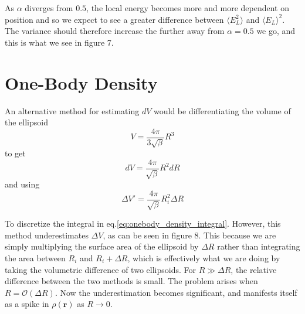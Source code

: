 \documentclass[
    a4paper, aps, twocolumn, floatfix, superscriptaddress,
    nofootinbib]{revtex4-1}
\begin{document}
\begin{appendices}
As $\alpha$ diverges from $0.5$, the local energy becomes more and more dependent on position and so we expect to see a greater difference between $\langle E_L^2 \rangle$ and $\langle E_L \rangle^2$. The variance should therefore increase the further away from $\alpha = 0.5$ we go, and this is what we see in figure 7. 

\section{One-Body Density}
An alternative method for estimating $dV$ would be differentiating the volume of the ellipsoid
\begin{equation}
    V = \frac{4\pi}{3\sqrt{\beta}}R^3
\end{equation}
to get
\begin{equation}
    dV = \frac{4\pi}{\sqrt{\beta}}R^2 dR
\end{equation}
and using
\begin{equation}
    \Delta V' = \frac{4\pi}{\sqrt{\beta}}R_i^2 \Delta R
\end{equation}


To discretize the integral in eq.\eqref{eq:onebody_density_integral}. However, this method underestimates $\Delta V$, as can be seen in figure 8. This because we are simply multiplying the surface area of the ellipsoid by $\Delta R$ rather than integrating the area between $R_i$ and $R_i+\Delta R$, which is effectively what we are  doing by taking the volumetric difference of two ellipsoids. For $R \gg \Delta R$, the relative difference between the two methods is small. The problem arises when $R=\mathcal{O}(\Delta R)$. Now the underestimation becomes significant, and manifests itself as a spike in $\rho(\boldsymbol{r})$ as $R\rightarrow 0$. 
\begin{figure}[H]
\makebox[0.5\textwidth][c]{}%
 \caption{}
 \label{fig:8}
\end{figure}





\end{appendices}
\end{document}
